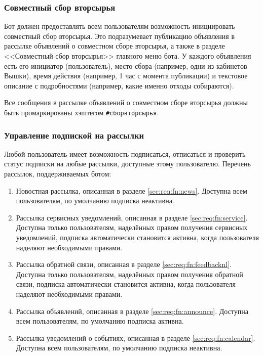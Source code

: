 \subsubsection{Совместный сбор вторсырья}
    Бот должен предоставлять всем пользователям возможность инициировать совместный сбор вторсырья.
    Это подразумевает публикацию объявления в рассылке объявлений о совместном сборе вторсырья,
    а также в разделе <<Совместный сбор вторсырья>> главного меню бота. У каждого объявления есть
    его инициатор (пользователь), место сбора (например, одни из кабинетов Вышки), время действия
    (например, 1 час с момента публикации) и текстовое описание с подробностями (например, какие
    именно отходы собираются).

    Все сообщения в рассылке объявлений о совместном сборе вторсырья должны быть промаркированы
    хэштегом \hbox{\texttt{\#сборвторсырья}}.

\subsubsection{Управление подпиской на рассылки}
    \label{sec:req:fn:subscriptions}
    Любой пользователь имеет возможность подписаться, отписаться и проверить статус подписки на
    любые рассылки, доступные этому пользователю. Перечень рассылок, поддерживаемых ботом:
    \begin{enumerate}
        \item
            Новостная рассылка, описанная в разделе \ref{sec:req:fn:news}.
            Доступна всем пользователям, по умолчанию подписка неактивна.
        \item
            Рассылка сервисных уведомлений, описанная в разделе \ref{sec:req:fn:service}.
            Доступна только пользователям, наделённых правом получения сервисных уведомлений,
            подписка автоматически становится активна, когда пользователя
            наделяют необходимыми правами.
        \item
            Рассылка обратной связи, описанная в разделе \ref{sec:req:fn:feedbacknl}.
            Доступна только пользователям, наделённых правом получения обратной связи,
            подписка автоматически становится активна, когда пользователя
            наделяют необходимыми правами.
        \item
            Рассылка объявлений, описанная в разделе \ref{sec:req:fn:announce}.
            Доступна всем пользователям, по умолчанию подписка активна.
        \item
            Рассылка уведомлений о событиях, описанная в разделе \ref{sec:req:fn:calendar}.
            Доступна всем пользователям, по умолчанию подписка неактивна.
    \end{enumerate}

